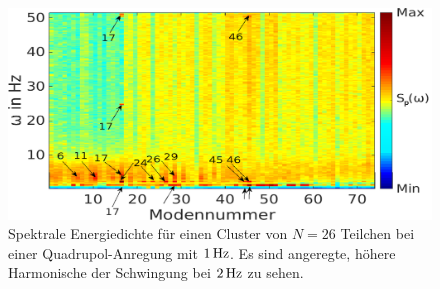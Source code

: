 \documentclass[numbers=noenddot,a4paper,notitlepage,twoside,BCOR15mm]{scrbook}
\begin{document}
							\begin{figure}[!b]
								\centering
								\includegraphics[width=\textwidth]{figs/auswertung/manipulation/quadrupol1Hzpowerdens.png}
								\caption{Spektrale Energiedichte für einen Cluster von $N=26$ Teilchen bei einer Quadrupol-Anregung mit $\unit[1]{Hz}$. Es sind angeregte, höhere Harmonische der Schwingung bei $\unit[2]{Hz}$ zu sehen.}\label{img:powerdensquadrupol1Hz}
							\end{figure}
\end{document}
